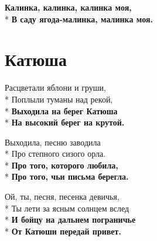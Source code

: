 \medskip

\begin{minipage}{\linewidth}
\hspace*{1.5em}\textbf{Калинка, калинка, калинка моя,}\\*
\hspace*{1.5em}\textbf{В саду ягода-малинка, малинка моя.}\\
\end{minipage}

\vspace{\fill}\newpage

\section{Катюша}
\label{song:Катюша}

\medskip

\begin{minipage}{\linewidth}
Расцветали яблони и груши,\\*
Поплыли туманы над рекой,\\*
\textbf{Выходила на берег Катюша }\\*
\textbf{На высокий берег на крутой.}\\
\end{minipage}\par\medskip\nobreak

\medskip

\begin{minipage}{\linewidth}
Выходила, песню заводила\\*
Про степного сизого орла.\\*
\textbf{Про того, которого любила,}\\*
\textbf{Про того, чьи письма берегла.}\\
\end{minipage}\par\medskip\nobreak

\medskip

\begin{minipage}{\linewidth}
Ой, ты, песня, песенка девичья,\\*
Ты лети за ясным солнцем вслед\\*
\textbf{И бойцу на дальнем пограничье}\\*
\textbf{От Катюши передай привет.}\\
\end{minipage}\par\medskip\nobreak

